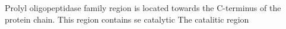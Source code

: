 Prolyl oligopeptidase family region is located towards the C-terminus of the protein chain. This region contains se catalytic The catalitic region 